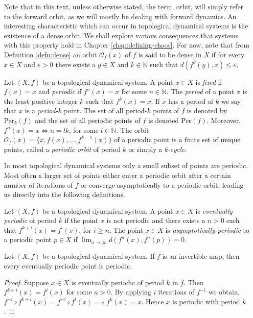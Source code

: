Note that in this text, unless otherwise stated, the term, orbit, will simply refer to the forward orbit, as we will mostly be dealing with forward dynamics. An interesting characteristic which can occur in topological dynamical systems is the existence of a dense orbit. We shall explore various consequences that systems with this property hold in Chapter \ref{chap:defining-chaos}. For now, note that from Definition \ref{defn:dense} an orbit $\mathcal{O}_f(x)$ of $f$ is said to be dense in $X$ if for every $x \in X$ and $\varepsilon > 0$ there exists a $y \in X$ and $k \in \mathbb{N}$ such that $d(f^k(y), x) \leq \varepsilon$.

\begin{defn} \label{defn:periodic-point}
    Let $(X, f)$ be a topological dynamical system. A point $x \in X$ is \emph{fixed} if $f(x) = x$ and \emph{periodic} if $f^n(x) = x$ for some $n \in \mathbb{N}$. The \emph{period} of a point $x$ is the least positive integer $k$ such that $f^k(x) = x$. If $x$ has a period of $k$ we say that $x$ is a \emph{period-$k$} point. The set of all period-$k$ points of $f$ is denoted by $\text{Per}_k(f)$ and the set of all periodic points of $f$ is denoted $\text{Per}(f)$. Moreover, $f^n(x) = x \iff n = lk$, for some $l \in \mathbb{N}$. The orbit $\mathcal{O}_f(x) = \lbrace x, f(x), \dots, f^{k-1}(x) \rbrace$ of a periodic point is a finite set of unique points, called a \emph{periodic orbit} of period $k$ or simply a \emph{k-cycle}.
\end{defn}

In most topological dynamical systems only a small subset of points are periodic. Most often a larger set of points either enter a periodic orbit after a certain number of iterations of $f$ or converge asymptotically to a periodic orbit, leading us directly into the following definitions.

\begin{defn} \label{defn:eventually-asymptotically-periodic}
    Let $(X, f)$ be a topological dynamical system. A point $x \in X$ is \emph{eventually periodic} of period $k$ if the point $x$ is not periodic and there exists a $n > 0$ such that $f^{k+i}(x) = f^i(x)$, for $i \geq n$. The point $x \in X$ is \emph{asymptotically periodic} to a periodic point $p \in X$ if $\lim_{n \to \infty} d(f^n(x), f^n(p)) = 0$.
\end{defn}

\begin{prop} \label{prop:eventually-periodic-implies-periodic}
    Let $(X, f)$ be a topological dynamical system. If $f$ is an invertible map, then every eventually periodic point is periodic.
    \begin{proof}
        Suppose $x \in X$ is eventually periodic of period $k$ in $f$. Then $f^{k + i}(x) = f^i(x)$ for some $n > 0$. By applying $i$ iterations of $f^{-1}$ we obtain, $f^{-i} \circ f^{k + i}(x) = f^{-i} \circ f^{i}(x) \implies f^k(x) = x$. Hence $x$ is periodic with period $k$.
    \end{proof}
\end{prop}

